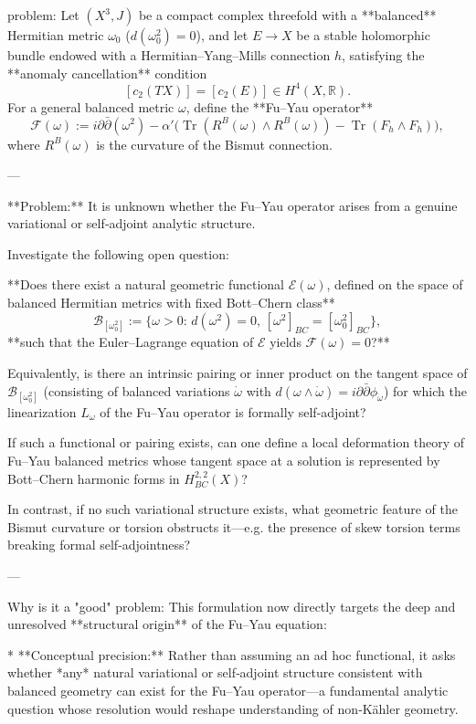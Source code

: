 problem:  
Let \((X^3,J)\) be a compact complex threefold with a **balanced** Hermitian metric \(\omega_0\) (\(d(\omega_0^2)=0\)), and let \(E\to X\) be a stable holomorphic bundle endowed with a Hermitian–Yang–Mills connection \(h\), satisfying the **anomaly cancellation** condition  
\[
[c_2(TX)] = [c_2(E)] \in H^{4}(X,\mathbb{R}).
\]
For a general balanced metric \(\omega\), define the **Fu–Yau operator**
\[
\mathcal{F}(\omega)
:=i\partial\bar\partial(\omega^2)
-\alpha'\big(\operatorname{Tr}(R^B(\omega)\wedge R^B(\omega))
-\operatorname{Tr}(F_h\wedge F_h)\big),
\]
where \(R^B(\omega)\) is the curvature of the Bismut connection.

---

**Problem:**  
It is unknown whether the Fu–Yau operator arises from a genuine variational or self‑adjoint analytic structure.

Investigate the following open question:

**Does there exist a natural geometric functional \(\mathcal{E}(\omega)\), defined on the space of balanced Hermitian metrics with fixed Bott–Chern class**
\[
\mathcal{B}_{[\omega_0^2]}:=\{\omega>0 :
\,d(\omega^2)=0,\,
[\omega^2]_{BC}=[\omega_0^2]_{BC}\},
\]
**such that the Euler–Lagrange equation of \(\mathcal{E}\) yields \(\mathcal{F}(\omega)=0\)?**

Equivalently, is there an intrinsic pairing or inner product on the tangent space of \(\mathcal{B}_{[\omega_0^2]}\) (consisting of balanced variations \(\dot\omega\) with \(d(\omega\wedge\dot\omega)=i\partial\bar\partial\phi_{\dot\omega}\)) for which the linearization \(L_\omega\) of the Fu–Yau operator is formally self‑adjoint?

If such a functional or pairing exists, can one define a local deformation theory of Fu–Yau balanced metrics whose tangent space at a solution is represented by Bott–Chern harmonic forms in \(H^{2,2}_{BC}(X)\)?  

In contrast, if no such variational structure exists, what geometric feature of the Bismut curvature or torsion obstructs it—e.g. the presence of skew torsion terms breaking formal self‑adjointness?

---

Why is it a "good" problem:  
This formulation now directly targets the deep and unresolved **structural origin** of the Fu–Yau equation:

* **Conceptual precision:**  
Rather than assuming an ad hoc functional, it asks whether *any* natural variational or self‑adjoint structure consistent with balanced geometry can exist for the Fu–Yau operator—a fundamental analytic question whose resolution would reshape understanding of non‑Kähler geometry.

